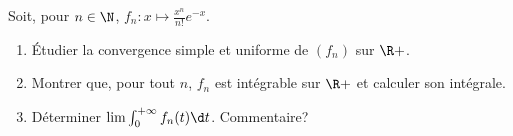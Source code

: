 \begin{enonce}
\begin{exercise}[ID={RMS133 E723},subtitle={Mines-Ponts PSI 2022},tags={},difficulty={}]
  Soit, pour $n\in\N$, $f_n : x\mapsto \frac{x^n}{n!} e^{-x}$.
  \begin{enumerate}
    \item Étudier la convergence simple et uniforme de $(f_n)$ sur $\R+$.
    \item Montrer que, pour tout $n$, $f_n$ est intégrable sur $\R+$ et calculer son intégrale.
    \item Déterminer $\lim\int_0^{+\infty} f_n(t)\d t$.  Commentaire?
  \end{enumerate}
\end{exercise}
\begin{solution}
\end{solution}
\end{enonce}
